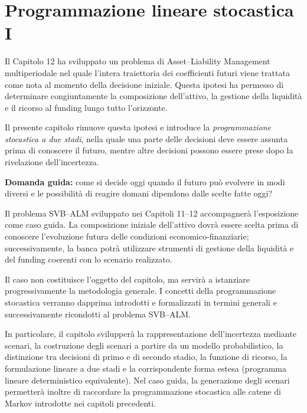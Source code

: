 
\chapter{Programmazione lineare stocastica I}

\label{cap:programmazione-stocastica-due-stadi}

\medskip

Il Capitolo 12 ha sviluppato un problema di Asset--Liability Management
multiperiodale nel quale l'intera traiettoria dei coefficienti futuri viene
trattata come nota al momento della decisione iniziale. Questa ipotesi ha
permesso di determinare congiuntamente la composizione dell'attivo, la
gestione della liquidit\`a e il ricorso al funding lungo tutto l'orizzonte.

Il presente capitolo rimuove questa ipotesi e introduce la
\emph{programmazione stocastica a due stadi}, nella quale una parte delle
decisioni deve essere assunta prima di conoscere il futuro, mentre altre
decisioni possono essere prese dopo la rivelazione dell'incertezza.

\medskip

\noindent
\textbf{Domanda guida:} come si decide oggi quando il futuro pu\`o evolvere
in modi diversi e le possibilit\`a di reagire domani dipendono dalle scelte
fatte oggi?

\medskip

Il problema SVB--ALM sviluppato nei Capitoli 11--12 accompagner\`a
l'esposizione come caso guida. La composizione iniziale dell'attivo dovr\`a
essere scelta prima di conoscere l'evoluzione futura delle condizioni
economico-finanziarie; successivamente, la banca potr\`a utilizzare strumenti
di gestione della liquidit\`a e del funding coerenti con lo scenario
realizzato.

Il caso non costituisce l'oggetto del capitolo, ma servir\`a a istanziare
progressivamente la metodologia generale. I concetti della programmazione
stocastica verranno dapprima introdotti e formalizzati in termini generali e
successivamente ricondotti al problema SVB--ALM.

In particolare, il capitolo svilupper\`a la rappresentazione dell'incertezza
mediante scenari, la costruzione degli scenari a partire da un modello
probabilistico, la distinzione tra decisioni di primo e di secondo stadio, la
funzione di ricorso, la formulazione lineare a due stadi e la corrispondente
forma estesa (programma lineare deterministico equivalente). Nel caso guida, la generazione degli scenari permetter\`a inoltre
di raccordare la programmazione stocastica alle catene di Markov introdotte
nei capitoli precedenti.

